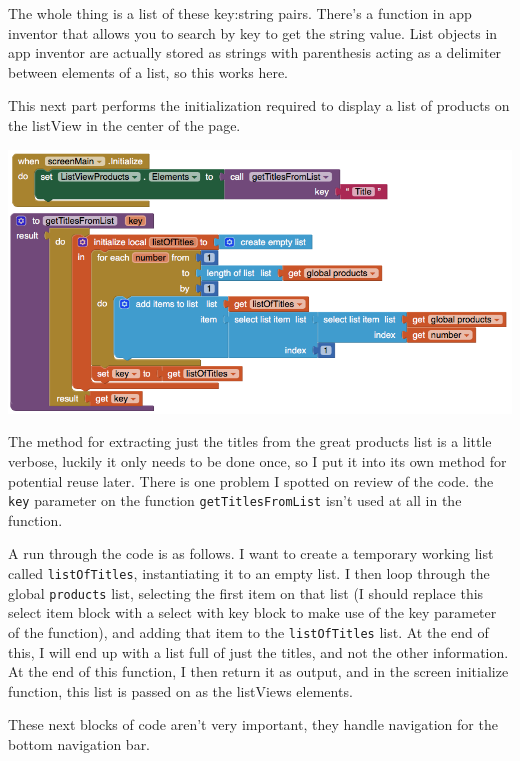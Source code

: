 \documentclass{scrreprt}
\begin{document}
The whole thing is a list of these key:string pairs. There's a function in app inventor that allows you to search by key to get the string value. List objects in app inventor are actually stored as strings with parenthesis acting as a delimiter between elements of a list, so this works here.

This next part performs the initialization required to display a list of products on the listView in the center of the page.

\begin{center}
    \includegraphics[width=\linewidth]{images/mainInit.png}
\end{center}

The method for extracting just the titles from the great products list is a little verbose, luckily it only needs to be done once, so I put it into its own method for potential reuse later. There is one problem I spotted on review of the code. the \texttt{key} parameter on the function \texttt{getTitlesFromList} isn't used at all in the function.

A run through the code is as follows. I want to create a temporary working list called \texttt{listOfTitles}, instantiating it to an empty list. I then loop through the global \texttt{products} list, selecting the first item on that list (I should replace this select item block with a select with key block to make use of the key parameter of the function), and adding that item to the \texttt{listOfTitles} list. At the end of this, I will end up with a list full of just the titles, and not the other information. At the end of this function, I then return it as output, and in the screen initialize function, this list is passed on as the listViews elements.

These next blocks of code aren't very important, they handle navigation for the bottom navigation bar.
\end{document}

